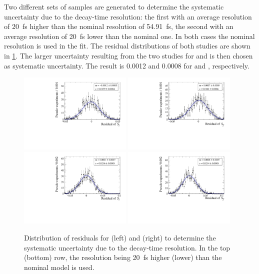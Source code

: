 Two different sets of samples are generated to determine the systematic uncertainty due to the decay-time resolution: the first with an average resolution of \SI{20}{\femto\second} higher than the nominal resolution of \SI{54.91}{\femto\second}, the second with an average resolution of \SI{20}{\femto\second} lower than the nominal one.
In both cases the nominal resolution is used in the fit.
The residual distributions of both studies are shown in \cref{fig:systUncertRes}.
The larger uncertainty resulting from the two studies for \Sf and \Sfbar is then chosen as systematic uncertainty.
The result is \num{0.0012} and \num{0.0008} for \Sf and \Sfbar, respectively.
\begin{figure}[tbp]
    \centering
    \includegraphics[width=0.48\textwidth]{11Systematics/figs/ResHigh_Sf_res.pdf}
    \includegraphics[width=0.48\textwidth]{11Systematics/figs/ResHigh_Sfbar_res.pdf}\\
    \includegraphics[width=0.48\textwidth]{11Systematics/figs/ResLow_Sf_res.pdf}
    \includegraphics[width=0.48\textwidth]{11Systematics/figs/ResLow_Sfbar_res.pdf}
    \caption{Distribution of residuals for \Sf (left) and \Sfbar (right) to determine the systematic uncertainty due to the decay-time resolution.
    In the top  (bottom) row, the resolution being \SI{20}{\femto\second} higher (lower) than the nominal model is used.}
    \label{fig:systUncertRes}
\end{figure}

